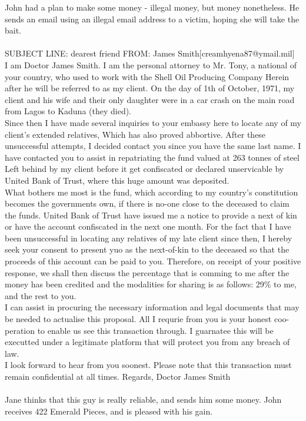 \documentclass{article}
\begin{document}
John had a plan to make some money {-} illegal money, but money nonetheless.
He sends an email using an illegal email address to a victim, hoping she will take the bait.
\\\\
SUBJECT LINE: dearest friend
FROM: James Smith[creamhyena87@ymail.mil]
\\
I am Doctor James Smith.
I am the personal attorney to Mr. Tony, a national of your country, who used to work with the Shell Oil Producing Company
Herein after he will be referred to as my client.
On the day of 1th of October, 1971, my client and his wife and their only daughter were in a car crash on the main road from Lagos to Kaduna (they died).
\\
Since then I have made several inquiries to your embassy here to locate any of my client's extended relatives, Which has also proved abbortive.
After these unsuccessful attempts, I decided contact you since you have the same last name.
I have contacted you to assist in repatriating the fund valued at 263 tonnes of steel Left behind by my client before it get confiscated or declared unservicable by United Bank of Trust, where this huge amount was deposited.
\\
What bothers me most is the fund, which according to my country's constitution becomes the governments own, if there is no{-}one close to the deceased to claim the funds.
United Bank of Trust have issued me a notice to provide a next of kin or have the account confiscated in the next one month.
For the fact that I have been unsuccessful in locating any relatives of my late client since then, I hereby seek your consent to present yuo as the next{-}of{-}kin to the deceased so that the proceeds of this account can be paid to you.
Therefore, on receipt of your positive response, we shall then discuss the percentage that is comming to me after the money has been credited and the modalities for sharing is as follows: 29\% to me, and the rest to you.
\\
I can assist in procuring the necessary information and legal documents that may be needed to actualise this proposal.
All I requrie from you is your honest coo{-}peration to enable us see this transaction through.
I guarnatee this will be executted under a legitimate platform that will protect you from any breach of law.
\\
I look forward to hear from you soonest.
Please note that this transaction must remain confidential at all times.
Regards, Doctor James Smith
\\\\
Jane thinks that this guy is really reliable, and sends him some money.
John receives 422 Emerald Pieces, and is pleased with his gain.
\end{document}
